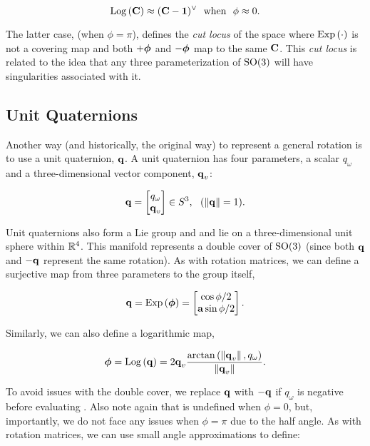 \begin{equation}
	\mathrm{Log}\left({\boldsymbol{\mathbf{C}}}\right) \approx (\boldsymbol{\mathbf{C}} - \boldsymbol{\mathbf{1}})^\vee ~~ \textrm{when} ~~ \phi \approx 0. 
\end{equation}

The latter case, (when $\phi = \pi$), defines the \textit{cut locus} of the space where $\mathrm{Exp}\left({\cdot}\right)$ is not a covering map and both $+\boldsymbol{\mathbf{\phi}}$ and $-\boldsymbol{\mathbf{\phi}}$ map to the same $\boldsymbol{\mathbf{C}}$. This \textit{cut locus} is related to the idea that any three parameterization of $\mathrm{SO}(3)$ will have singularities associated with it.

\subsection{Unit Quaternions}

Another way (and historically, the original way) to represent a general rotation is to use a unit quaternion, $\boldsymbol{\mathbf{q}}$. A unit quaternion has four parameters, a scalar $q_\omega$ and a three-dimensional vector component, $\boldsymbol{\mathbf{q}}_v$:

\begin{equation}
	\boldsymbol{\mathbf{q}} = \begin{bmatrix} q_\omega \\ \boldsymbol{\mathbf{q}}_v \end{bmatrix} \in S^3, ~~ (\left\Vert\boldsymbol{\mathbf{q}}\right\Vert = 1).
\end{equation}

Unit quaternions also form a Lie group \citep{Sola2018-kg} and and lie on a three-dimensional unit sphere within $\mathbb{R}{}^4$. This manifold represents a double cover of $\mathrm{SO}(3)$ (since both $\boldsymbol{\mathbf{q}}$ and $-\boldsymbol{\mathbf{q}}$ represent the same rotation). As with rotation matrices, we can define a surjective map from three parameters to the group itself,

\begin{equation}
\boldsymbol{\mathbf{q}} = \mathrm{Exp}\left({\boldsymbol{\mathbf{\phi}}}\right) = \begin{bmatrix} \cos{\phi/2} \\ \boldsymbol{\mathbf{a}} \sin{\phi/2} \end{bmatrix}.	
\end{equation}

Similarly, we can also define a logarithmic map,

\begin{align}
\label{eq:math_quat_log}
	\boldsymbol{\mathbf{\phi}} =  \mathrm{Log}\left({\boldsymbol{\mathbf{q}}}\right) = 2 \boldsymbol{\mathbf{q}}_v \frac{\arctan{(\left\Vert \boldsymbol{\mathbf{q}} _v\right\Vert ,  q_\omega})}{\left\Vert\boldsymbol{\mathbf{q}}_v\right\Vert}.
\end{align}

To avoid issues with the double cover, we replace $\boldsymbol{\mathbf{q}}$ with $-\boldsymbol{\mathbf{q}}$ if $q_\omega$ is negative before evaluating . Also note again that  is undefined when $\phi = 0$, but, importantly, we do not face any issues when $\phi = \pi$ due to the half angle. As with rotation matrices, we can use small angle approximations to define:


